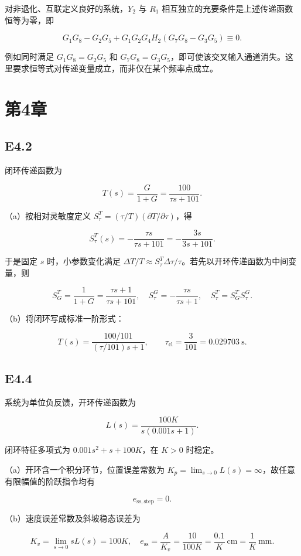 \documentclass[UTF8,12pt]{ctexart}
\begin{document}
对非退化、互联定义良好的系统，$Y_2$ 与 $R_1$ 相互独立的充要条件是上述传递函数恒等为零，即

\[
\boxed{G_1G_8-G_2G_5+G_1G_2G_4H_2(G_7G_8-G_3G_5)\equiv0.}
\]

例如同时满足 $G_1G_8=G_2G_5$ 和 $G_7G_8=G_3G_5$，即可使该交叉输入通道消失。这里要求恒等式对传递变量成立，而非仅在某个频率点成立。


\section*{第4章}

\subsection*{E4.2}
闭环传递函数为

\[
T(s)=\frac{G}{1+G}=\frac{100}{\tau s+101}.
\]

（a）按相对灵敏度定义 $S_\tau^T=(\tau/T)(\partial T/\partial\tau)$，得

\[
\boxed{S_\tau^T(s)=-\frac{\tau s}{\tau s+101}=-\frac{3s}{3s+101}}.
\]

于是固定 $s$ 时，小参数变化满足 $\Delta T/T\approx S_\tau^T\Delta\tau/\tau$。若先以开环传递函数为中间变量，则

\[
S_G^T=\frac1{1+G}=\frac{\tau s+1}{\tau s+101},\quad S_\tau^G=-\frac{\tau s}{\tau s+1},\quad S_\tau^T=S_G^TS_\tau^G.
\]

（b）将闭环写成标准一阶形式：

\[
T(s)=\frac{100/101}{(\tau/101)s+1},\qquad \boxed{\tau_{\mathrm{cl}}=\frac3{101}=0.029703\ \mathrm s}.
\]


\subsection*{E4.4}
系统为单位负反馈，开环传递函数为

\[
L(s)=\frac{100K}{s(0.001s+1)}.
\]

闭环特征多项式为 $0.001s^2+s+100K$，在 $K>0$ 时稳定。

（a）开环含一个积分环节，位置误差常数为 $K_p=\lim_{s\to0}L(s)=\infty$，故任意有限幅值的阶跃指令均有

\[
\boxed{e_{\mathrm{ss,step}}=0}.
\]

（b）速度误差常数及斜坡稳态误差为

\[
K_v=\lim_{s\to0}sL(s)=100K,\quad e_{\mathrm{ss}}=\frac{A}{K_v}=\frac{10}{100K}=\frac{0.1}{K}\ \mathrm{cm}=\frac1K\ \mathrm{mm}.
\]
\end{document}
